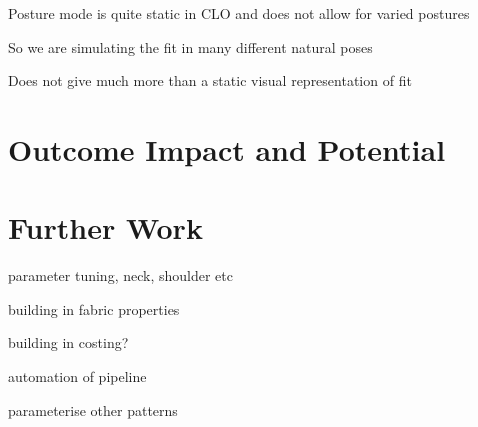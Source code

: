 Posture mode is quite static in CLO and does not allow for varied postures

So we are simulating the fit in many different natural poses

Does not give much more than a static visual representation of fit

\section{Outcome Impact and Potential}

\section{Further Work}
parameter tuning, neck, shoulder etc

building in fabric properties

building in costing?

automation of pipeline

parameterise other patterns